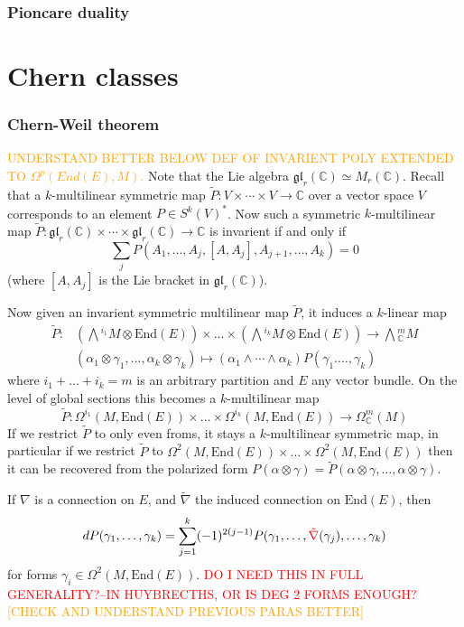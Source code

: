 \documentclass[a4paper]{article}
\theoremstyle{definition} \newtheorem*{definition}{Definition}
\theoremstyle{definition} \newtheorem*{definitions}{Definitions}
\theoremstyle{plain} \newtheorem{theorem}{Theorem}[section]
\theoremstyle{plain} \newtheorem{proposition}[theorem]{Proposition}
\theoremstyle{plain} \newtheorem{corollary}[theorem]{Corollary}
\theoremstyle{plain} \newtheorem{lemma}[theorem]{Lemma}
\theoremstyle{plain} \newtheorem{example}[theorem]{Example}
\newcommand{\checkCorrect}[1]{\textcolor{red}{#1}}
\newcommand{\understandBetter}[1]{\textcolor{orange}{#1}}
\newcommand{\complexnos}{\mathbb{C}}
\newcommand{\End}{\text{End}}
\begin{document}
\subsubsection{Pioncare duality}

\section{Chern classes}


\subsubsection{Chern-Weil theorem}

\understandBetter{UNDERSTAND BETTER BELOW
DEF OF INVARIENT POLY EXTENDED TO $\Omega^p(End(E), M)$.}
Note that the Lie algebra $\mathfrak{gl}_r(\complexnos)\simeq M_r(\complexnos)$. Recall that a $k$-multilinear symmetric map $\tilde{P}:V\times \cdots \times V\to \complexnos$ over a vector space $V$ corresponds to an element $P\in S^k(V)^*$. Now such a symmetric $k$-multilinear map $\tilde{P}: \mathfrak{gl}_r(\complexnos)\times \cdots \times \mathfrak{gl}_r(\complexnos)\to \complexnos$ is invarient if and only if 
$$\sum_j P(A_1, \ldots, A_j, [A, A_j], A_{j+1}, \ldots, A_k)=0$$
(where $[A, A_j]$ is the Lie bracket in $\mathfrak{gl}_r(\complexnos)$). 

Now given an invarient symmetric multilinear map $\tilde{P}$, it induces a $k$-linear map
\begin{align*}
    \tilde{P} : & \left( \bigwedge {}^{i_1}M\otimes \End(E) \right) \times \ldots \times \left( \bigwedge {}^{i_k}M\otimes \End(E) \right)  \to \bigwedge {}^m_\complexnos M \\
    & (\alpha_1\otimes \gamma_1, \ldots, \alpha_k\otimes \gamma_k) \mapsto (\alpha_1\wedge \cdots \wedge \alpha_k)P(\gamma_1. \ldots, \gamma_k)
\end{align*}
where $i_1+\ldots +i_k=m$ is an arbitrary partition and $E$ any vector bundle. On the level of global sections this becomes a $k$-multilinear map 
$$\tilde{P}:\Omega^{i_1}(M, \End(E))\times \ldots \times \Omega^{i_k}(M, \End(E))\to \Omega^m_\complexnos(M)$$
If we restrict $\tilde{P}$ to only even froms, it stays a $k$-multilinear symmetric map, in particular if we restrict $\tilde{P}$ to $\Omega^{2}(M, \End(E))\times \ldots \times \Omega^{2}(M, \End(E))$
then it can be recovered from the polarized form $P(\alpha\otimes \gamma)=\tilde{P}(\alpha\otimes\gamma, \ldots, \alpha\otimes\gamma)$.

If $\nabla$ is a connection on $E$, and $\tilde{\nabla}$ the induced connection on $\End(E)$, then 
$$dP(\gamma_1, \ldots, \gamma_k)=\sum_{j=1}^k (-1)^{2(j-1)}P(\gamma_1, \ldots, \checkCorrect{\tilde{\nabla}}(\gamma_j), \ldots, \gamma_k)$$
for forms $\gamma_i\in \Omega^2(M, \End(E))$. \checkCorrect{DO I NEED THIS IN FULL GENERALITY?--IN HUYBRECTHS, OR IS DEG 2 FORMS ENOUGH?}
\understandBetter{[CHECK AND UNDERSTAND PREVIOUS PARAS BETTER]}
\end{document}
